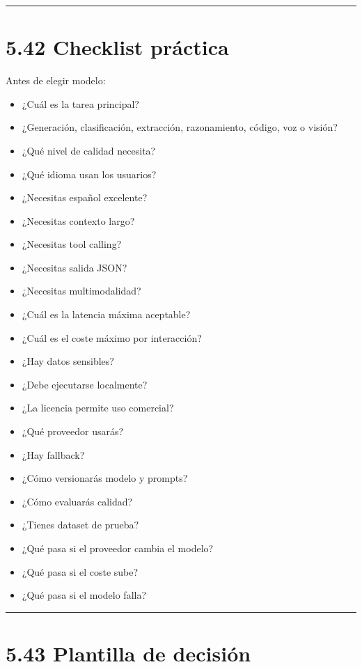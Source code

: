 \begin{center}\rule{0.5\linewidth}{0.5pt}\end{center}

\section{5.42 Checklist práctica}\label{checklist-pruxe1ctica-4}

Antes de elegir modelo:

\begin{itemize}
\tightlist
\item
  ¿Cuál es la tarea principal?
\item
  ¿Generación, clasificación, extracción, razonamiento, código, voz o
  visión?
\item
  ¿Qué nivel de calidad necesita?
\item
  ¿Qué idioma usan los usuarios?
\item
  ¿Necesitas español excelente?
\item
  ¿Necesitas contexto largo?
\item
  ¿Necesitas tool calling?
\item
  ¿Necesitas salida JSON?
\item
  ¿Necesitas multimodalidad?
\item
  ¿Cuál es la latencia máxima aceptable?
\item
  ¿Cuál es el coste máximo por interacción?
\item
  ¿Hay datos sensibles?
\item
  ¿Debe ejecutarse localmente?
\item
  ¿La licencia permite uso comercial?
\item
  ¿Qué proveedor usarás?
\item
  ¿Hay fallback?
\item
  ¿Cómo versionarás modelo y prompts?
\item
  ¿Cómo evaluarás calidad?
\item
  ¿Tienes dataset de prueba?
\item
  ¿Qué pasa si el proveedor cambia el modelo?
\item
  ¿Qué pasa si el coste sube?
\item
  ¿Qué pasa si el modelo falla?
\end{itemize}

\begin{center}\rule{0.5\linewidth}{0.5pt}\end{center}

\section{5.43 Plantilla de decisión}\label{plantilla-de-decisiuxf3n}

